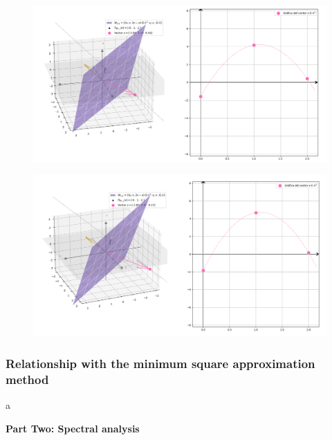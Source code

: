 \documentclass[]{beamer}
\theoremstyle{definition}
\begin{document}
\begin{frame}
\begin{figure}[h]
\includegraphics[scale = 0.3]{6Dic_3}
\end{figure}
\end{frame}

\begin{frame}
\begin{figure}[h]
\includegraphics[scale = 0.3]{6Dic_4}
\end{figure}
\end{frame}


\begin{frame}
\frametitle{Relationship with the minimum square approximation method}
a
\end{frame}


\begin{frame}
\Huge{
\textbf{
Part Two: Spectral analysis
}}
\end{frame}
\end{document}
